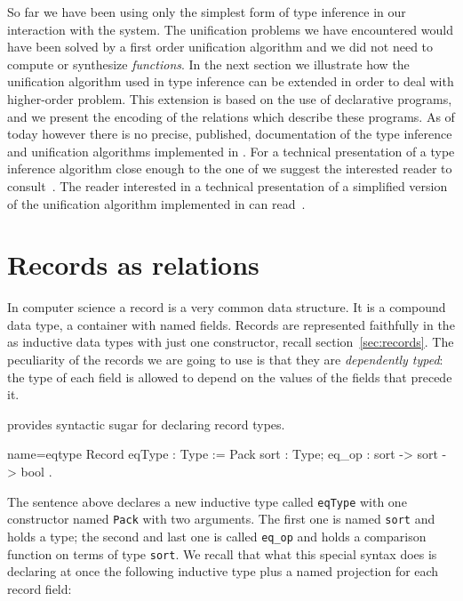 So far we have been using only the simplest form of type inference in
our interaction with the system. The unification problems we have
encountered would have been solved by a first order unification
algorithm and we did not need to compute or synthesize
\emph{functions}. In the next section we illustrate how the
unification algorithm used in type inference can be extended in order
to deal with higher-order problem. This extension is based on the use
of declarative programs, and we present the encoding of the relations
which describe these programs.
As of today however there is no precise, published, documentation of the type
inference and unification algorithms implemented in \Coq{}.  For a
technical presentation of a type inference algorithm close enough to
the one of \Coq{} we suggest the interested reader to
consult~\cite{DBLP:journals/corr/abs-1202-4905}.  The reader
interested in a technical presentation of a simplified version of the
unification algorithm implemented in \Coq{} can
read~\cite{unifcoq,betaderekjournal}.

\section{Records as relations}\label{sec:eqtype}

In computer science a record is a very common data structure.  It is a
compound data type, a container with named fields.  Records are
represented faithfully in the \mcbCIC{} as
inductive data types with just one constructor,
recall section~\ref{sec:records}.
The peculiarity of the records we are going to use is that they are
\emph{dependently typed}: the type of each field is allowed to depend on
the values of the fields that precede it.

\Coq{} provides syntactic sugar for declaring record types.

\begin{coq}{name=eqtype}{}
Record eqType : Type := Pack {
  sort : Type;
  eq_op : sort -> sort -> bool
}.
\end{coq}
\label{eqtype:noproof}

The sentence above declares a new inductive type called
\lstinline/eqType/ with one constructor named
\lstinline/Pack/ with two arguments.  The first one
is named \lstinline/sort/ and holds a type; the second and last
one is called \lstinline/eq_op/ and holds a comparison function
on terms of type \lstinline/sort/.  We recall that what this special syntax
does is declaring at once the following inductive type plus
a named projection for each record field:

